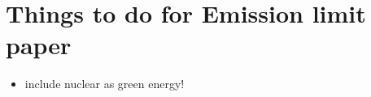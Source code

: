\documentclass[11pt]{article}
\title{}
\date{}
\begin{document}
	\section*{Things to do for Emission limit paper}
	\begin{itemize}
		\item include nuclear as green energy!
		
	\end{itemize}
	
	
%	
\end{document}
